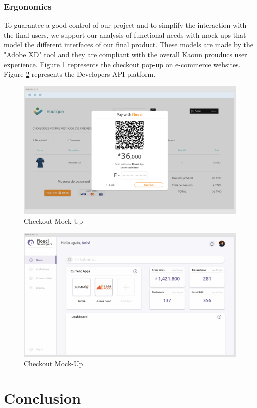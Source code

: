 \begin{spacing}{1.2}
\subsubsection{Ergonomics}
To guarantee a good control of our project and to simplify the interaction with the final users, we support our analysis of functional needs with mock-ups that model the different interfaces of our final product. These models are made by the "Adobe XD" tool and they are compliant with the overall Kaoun prouducs user experience. \newline Figure \ref{checkoutScreen} represents the checkout pop-up on e-commerce websites.
\newline Figure \ref{developersPlatform} represents the Developers API platform.

\begin{figure}[H]\centering
\includegraphics[scale=0.4]{Checkout_screen}
\caption{Checkout Mock-Up}
\label{checkoutScreen}
\end{figure}

\begin{figure}[H]\centering
\includegraphics[scale=0.4]{web_screen}
\caption{Checkout Mock-Up}
\label{developersPlatform}
\end{figure}

\section*{Conclusion}

\end{spacing}
